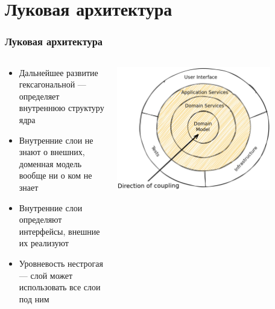 \documentclass{../cscslides}
\begin{document}
    \section{Луковая архитектура}

    \begin{frame}
        \frametitle{Луковая архитектура}
        \begin{columns}
            \begin{column}{0.5\textwidth}
                \begin{itemize}
                    \item Дальнейшее развитие гексагональной --- определяет внутреннюю структуру ядра
                    \item Внутренние слои не знают о внешних, доменная модель вообще ни о ком не знает
                    \item Внутренние слои определяют интерфейсы, внешние их реализуют
                    \item Уровневость нестрогая --- слой может использовать все слои под ним
                \end{itemize}
            \end{column}
            \begin{column}{0.5\textwidth}
                \begin{center}
                    \includegraphics[width=0.8\textwidth]{onionArchitecture.png}
                \end{center}
            \end{column}
        \end{columns}
    \end{frame}
\end{document}

